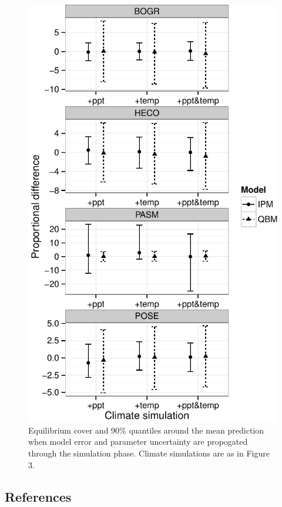\documentclass[12pt,]{article}
\begin{document}
\begin{figure}[htbp]
\centering
\includegraphics{components/figure/manuscript-figure_6.pdf}
\caption{Equilibrium cover and 90\% quantiles around the mean prediction
when model error and parameter uncertainty are propogated through the
simulation phase. Climate simulations are as in Figure 3.}
\end{figure}

\pagebreak{}

\subsection{References}\label{references}
\end{document}
